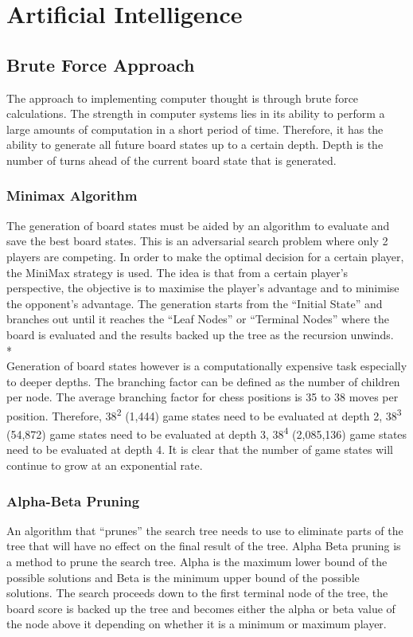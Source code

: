 \documentclass[11pt,a4paper]{article}
\begin{document}
\newpage
\section{Artificial Intelligence}

\subsection{Brute Force Approach}
\indent\indent The approach to implementing computer thought is through brute force calculations. The strength in computer systems lies in its ability to perform a large amounts of computation in a short period of time. Therefore, it has the ability to generate all future board states up to a certain depth. Depth is the number of turns ahead of the current board state that is generated. 

\subsubsection{Minimax Algorithm}
\indent\indent The generation of board states must be aided by an algorithm to evaluate and save the best board states. This is an adversarial search problem where only 2 players are competing. In order to make the optimal decision for a certain player, the MiniMax strategy is used. The idea is that from a certain player’s perspective, the objective is to maximise the player’s advantage and to minimise the opponent’s advantage. The generation starts from the “Initial State” and branches out until it reaches the “Leaf Nodes” or “Terminal Nodes” where the board is evaluated and the results backed up the tree as the recursion unwinds.\cite{chess1}
\\*\\
\indent Generation of board states however is a computationally expensive task especially to deeper depths. The branching factor can be defined as the number of children per node. The average branching factor for chess positions is 35 to 38 moves per position.  Therefore, 38\textsuperscript{2} (1,444) game states need to be evaluated at depth 2, 38\textsuperscript{3} (54,872) game states need to be evaluated at depth 3, 38\textsuperscript{4} (2,085,136) game states need to be evaluated at depth 4. It is clear that the number of game states will continue to grow at an exponential rate.\cite{chess2}

\subsubsection{Alpha-Beta Pruning}
\indent\indent An algorithm that “prunes” the search tree needs to use to eliminate parts of the tree that will have no effect on the final result of the tree. Alpha Beta pruning is a method to prune the search tree. Alpha is the maximum lower bound of the possible solutions and Beta is the minimum upper bound of the possible solutions. The search proceeds down to the first terminal node of the tree, the board score is backed up the tree and becomes either the alpha or beta value of the node above it depending on whether it is a minimum or maximum player. 
\end{document}
